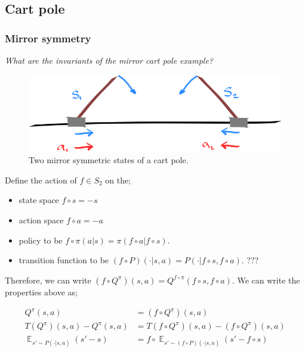 \subsection{Cart pole} \label{game-invariants}

\subsubsection{Mirror symmetry}

\begin{displayquote}
\textit{What are the invariants of the mirror cart pole example?}
\end{displayquote}

\begin{figure}[h!]
	\centering
	\includegraphics[width=1\textwidth,height=0.25\textheight]{../../pictures/drawings/cart-pole-mirror.png}
	\caption{Two mirror symmetric states of a cart pole.}
\end{figure}

Define the action of $f \in S_2$ on the;

\begin{itemize}
	\tightlist
	\item state space $f \circ s = -s$
	\item action space $f \circ a = -a$
 	\item policy to be $f \circ \pi(a | s) = \pi(f \circ a | f \circ s)$.
	\item transition function to be $(f \circ P)(\cdot | s, a) = P(\cdot| f \circ s, f \circ a)$. ???
\end{itemize}

Therefore, we can write $(f \circ Q^{\pi})(s, a) = Q^{f \circ \pi}(f \circ s, f \circ a)$.
We can write the properties above as;

\begin{align*}
Q^\pi(s, a) &= (f \circ Q^{\pi})(s, a) \tag{expected return}\\
T(Q^\pi)(s,a) - Q^\pi(s,a) &=T(f \circ Q^\pi)(s, a) - (f \circ Q^\pi)(s,a) \tag{Bellman residual}\\
\mathop{\mathbb E}_{s' \sim P(\cdot| s, a)} (s' - s) &= f \circ \mathop{\mathbb E}_{s' \sim (f \circ P)(\cdot| s, a)} (s' - f \circ s) \tag{change in state}\\
\end{align*}
\footnotemark[14]


